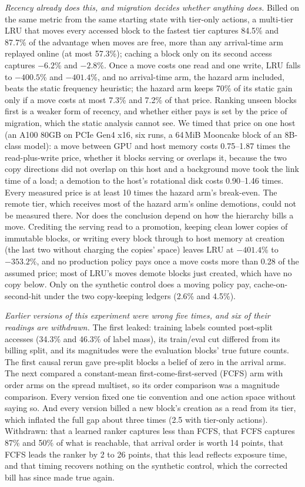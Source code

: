 \emph{Recency already does this, and migration decides whether anything does.} Billed on the same metric
from the same starting state with tier-only actions, a multi-tier LRU that moves every accessed block to
the fastest tier captures 84.5\% and 87.7\% of the advantage when moves are free, more than any
arrival-time arm replayed online (at most 57.3\%); caching a block only on its second access captures
$-6.2$\% and $-2.8$\%. Once a move costs one read and one write, LRU falls to $-400.5$\% and
$-401.4$\%, and no arrival-time arm, the hazard arm included, beats the static frequency heuristic; the
hazard arm keeps 70\% of its static gain only if a move costs at most 7.3\% and 7.2\% of that price.
Ranking unseen blocks first is a weaker form of recency, and whether either pays is set by the price of
migration, which the static analysis cannot see. We timed that price on one host (an A100 80GB on PCIe
Gen4 x16, six runs, a 64\,MiB Mooncake block of an 8B-class model): a move between GPU and host memory
costs 0.75--1.87 times the read-plus-write price, whether it blocks serving or overlaps it, because the
two copy directions did not overlap on this host and a background move took the link time of a load;
a demotion to the host's rotational disk costs 0.90--1.46 times. Every measured price is at least 10
times the hazard arm's break-even. The remote tier, which receives most of the hazard arm's online
demotions, could not be measured there. Nor does the conclusion depend on how the hierarchy bills a move.
Crediting the serving read to a promotion, keeping clean lower copies of immutable blocks, or writing
every block through to host memory at creation (the last two without charging the copies' space)
leaves LRU at $-401.4$\% to $-353.2$\%, and no production policy pays once a move costs more than
0.28 of the assumed price; most of LRU's moves demote blocks just created, which have no copy below.
Only on the synthetic control does a moving policy pay, cache-on-second-hit under the two copy-keeping
ledgers (2.6\% and 4.5\%).

\emph{Earlier versions of this experiment were wrong five times, and six of their readings are
withdrawn.} The first leaked: training labels counted post-split accesses (34.3\% and 46.3\% of label
mass), its train/eval cut differed from its billing split, and its magnitudes were the evaluation blocks'
true future counts. The first causal rerun gave pre-split blocks a belief of zero in the arrival arms.
The next compared a constant-mean first-come-first-served (FCFS) arm with order arms on the spread multiset, so its order comparison
was a magnitude comparison. Every version fixed one tie convention and one action space without saying
so. And every version billed a new block's creation as a read from its tier, which inflated the full
gap about three times (2.5 with tier-only actions). Withdrawn: that a learned ranker captures less than
FCFS, that FCFS captures 87\% and 50\% of what is reachable, that arrival order is worth 14 points, that
FCFS leads the ranker by 2 to 26 points, that this lead reflects exposure time, and that timing recovers
nothing on the synthetic control, which the corrected bill has since made true again.


